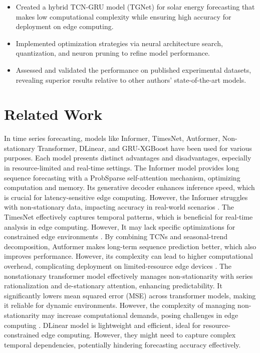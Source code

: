 \documentclass[sn-mathphys-num]{sn-jnl}%
\begin{document}
\begin{itemize}
    \item Created a hybrid TCN-GRU model (TGNet) for solar energy forecasting that makes low computational complexity while ensuring high accuracy for deployment on edge computing. 
    \item Implemented optimization strategies via neural architecture search, quantization, and neuron pruning to refine model performance. 
    \item Assessed and validated the performance on published experimental datasets, revealing superior results relative to other authors' state-of-the-art models.
\end{itemize}
 
\section{Related Work}\label{sec2}
In time series forecasting, models like Informer, TimesNet, Autformer, Non-stationary Transformer, DLinear, and GRU-XGBoost have been used for various purposes. Each model presents distinct advantages and disadvantages, especially in resource-limited and real-time settings. The Informer model provides long sequence forecasting with a ProbSparse self-attention mechanism, optimizing computation and memory. Its generative decoder enhances inference speed, which is crucial for latency-sensitive edge computing. However, the Informer struggles with non-stationary data, impacting accuracy in real-world scenarios \cite{zhou2021informer}. The TimesNet effectively captures temporal patterns, which is beneficial for real-time analysis in edge computing. However, It may lack specific optimizations for constrained edge environments \cite{wu2022timesnet}. By combining TCNs and seasonal-trend decomposition, Autformer makes long-term sequence prediction better, which also improves performance. However, its complexity can lead to higher computational overhead, complicating deployment on limited-resource edge devices  \cite{fan2023tedformer}. The nonstationary transformer model effectively manages non-stationarity with series rationalization and de-stationary attention, enhancing predictability. It significantly lowers mean squared error (MSE) across transformer models, making it reliable for dynamic environments. However, the complexity of managing non-stationarity may increase computational demands, posing challenges in edge computing \cite{liu2022non}. DLinear model is lightweight and efficient, ideal for resource-constrained edge computing. However, they might need to capture complex temporal dependencies, potentially hindering forecasting accuracy effectively.\\ 
\end{document}
